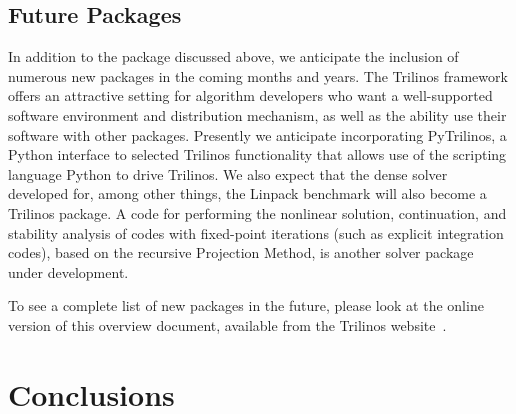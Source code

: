 \documentclass[12pt,relax]{TrilinosOverview}
\begin{document}
\subsection{Future Packages}

In addition to the package discussed above, we anticipate the
inclusion of numerous new packages in the coming months and years.
The Trilinos framework offers an attractive setting for algorithm
developers who want a well-supported software environment and
distribution mechanism, as well as the ability use their software with
other packages.  Presently we anticipate incorporating PyTrilinos, a
Python interface to selected Trilinos functionality that allows use of
the scripting language Python to drive Trilinos.  We also expect that
the dense solver developed for, among other things, the Linpack
benchmark will also become a Trilinos package. A code for
performing the nonlinear solution, continuation, and stability 
analysis of codes with fixed-point iterations (such as explicit
integration codes), based on the recursive Projection Method, is
another solver package under development.

To see a complete list of new packages in the future, please look at
the online version of this overview document, available from the
Trilinos website~\cite{Trilinos-home-page}.


\section{Conclusions}
\end{document}
